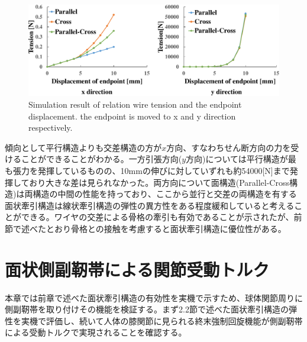 \documentclass{jarticle}
\begin{document}
\begin{figure}[tb]
 \centering
  \includegraphics[width=1.15\columnwidth]{figs/xy.pdf}
  \vspace*{-4mm}
  \caption{Simulation result of relation wire tension and the endpoint displacement. the endpoint is moved to x and y direction respectively.}
  \label{fig:simulation}
\end{figure}
傾向として平行構造よりも交差構造の方が${x}$方向、すなわちせん断方向の力を受けることができることがわかる。一方引張方向(${y}$方向)については平行構造が最も張力を発揮しているものの、10mmの伸びに対していずれも約54000[N]まで発揮しており大きな差は見られなかった。両方向について面構造(Parallel-Cross構造)は両構造の中間の性能を持っており、ここから並行と交差の両構造を有する面状牽引構造は線状牽引構造の弾性の異方性をある程度緩和していると考えることができる。ワイヤの交差による骨格の牽引も有効であることが示されたが、前節で述べたとおり骨格との接触を考慮すると面状牽引構造に優位性がある。

\section{面状側副靭帯による関節受動トルク}
本章では前章で述べた面状牽引構造の有効性を実機で示すため、球体関節周りに側副靭帯を取り付けその機能を検証する。まず2.2節で述べた面状牽引構造の弾性を実機で評価し、続いて人体の膝関節に見られる終末強制回旋機能が側副靭帯による受動トルクで実現されることを確認する。
\end{document}
